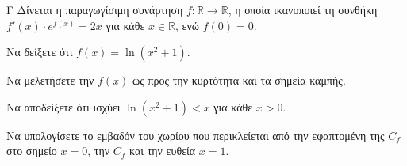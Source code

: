 \begin{thema}{Γ}
Δίνεται η παραγωγίσιμη συνάρτηση $f: \mathbb{R} \to \mathbb{R}$, η οποία ικανοποιεί τη συνθήκη $f'(x) \cdot e^{f(x)} = 2x$ για κάθε $x \in \mathbb{R}$, ενώ $f(0) = 0$.
\begin{erwthma}
  \item Να δείξετε ότι $f(x)=\ln\left(x^2+1\right)$.
  \item Να μελετήσετε την $f(x)$ ως προς την κυρτότητα και τα σημεία καμπής.
  \item Να αποδείξετε ότι ισχύει $\ln(x^2+1) < x$ για κάθε $x>0$.
  \item Να υπολογίσετε το εμβαδόν του χωρίου που περικλείεται από την εφαπτομένη της $C_f$ στο σημείο $x=0$, την $C_f$ και την ευθεία $x=1$.
\end{erwthma}
\end{thema}
